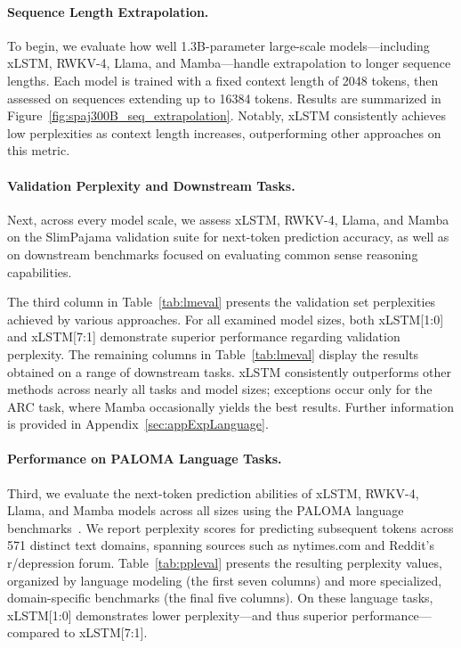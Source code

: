 \paragraph{Sequence Length Extrapolation.}
\label{sec:spaj300B_ctx_extrapolation}
To begin, we evaluate how well 1.3B-parameter large-scale models—including xLSTM, RWKV-4, Llama, and Mamba—handle extrapolation to longer sequence lengths. Each model is trained with a fixed context length of 2048 tokens, then assessed on sequences extending up to 16384 tokens. Results are summarized in Figure~\ref{fig:spaj300B_seq_extrapolation}. Notably, xLSTM consistently achieves low perplexities as context length increases, outperforming other approaches on this metric.

\paragraph{Validation Perplexity and Downstream Tasks.}
\label{sec:spaj_downstream_eval}
Next, across every model scale, we assess xLSTM, RWKV-4, Llama, and Mamba on the SlimPajama validation suite for next-token prediction accuracy, as well as on downstream benchmarks focused on evaluating common sense reasoning capabilities.

The third column in Table~\ref{tab:lmeval} presents the validation set perplexities achieved by various approaches. For all examined model sizes, both xLSTM[1:0] and xLSTM[7:1] demonstrate superior performance regarding validation perplexity. The remaining columns in Table~\ref{tab:lmeval} display the results obtained on a range of downstream tasks. xLSTM consistently outperforms other methods across nearly all tasks and model sizes; exceptions occur only for the ARC task, where Mamba occasionally yields the best results. Further information is provided in Appendix~\ref{sec:appExpLanguage}.

\paragraph{Performance on PALOMA Language Tasks.} Third, we evaluate the next-token prediction abilities of xLSTM, RWKV-4, Llama, and Mamba models across all sizes using the PALOMA language benchmarks~\citep{Magnusson:23arxivshort}. We report perplexity scores for predicting subsequent tokens across 571 distinct text domains, spanning sources such as nytimes.com and Reddit's r/depression forum. Table~\ref{tab:ppleval} presents the resulting perplexity values, organized by language modeling (the first seven columns) and more specialized, domain-specific benchmarks (the final five columns). On these language tasks, xLSTM[1:0] demonstrates lower perplexity—and thus superior performance—compared to xLSTM[7:1].

